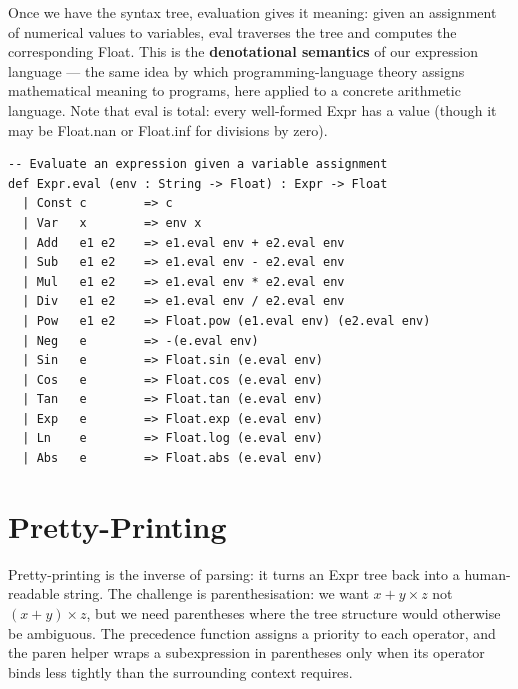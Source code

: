 \documentclass[12pt, openany]{book}
\theoremstyle{plain}
\theoremstyle{definition}
\theoremstyle{remark}
\newcommand{\li}[1]{{\ttfamily\small\color{tealaccent}#1}}
\begin{document}
Once we have the syntax tree, evaluation gives it meaning: given an assignment of numerical values to variables, \li{eval} traverses the tree and computes the corresponding \li{Float}.  This is the \textbf{denotational semantics} of our expression language --- the same idea by which programming-language theory assigns mathematical meaning to programs, here applied to a concrete arithmetic language.  Note that \li{eval} is total: every well-formed \li{Expr} has a value (though it may be \li{Float.nan} or \li{Float.inf} for divisions by zero).

\begin{leanbox}
\begin{lstlisting}
-- Evaluate an expression given a variable assignment
def Expr.eval (env : String -> Float) : Expr -> Float
  | Const c        => c
  | Var   x        => env x
  | Add   e1 e2    => e1.eval env + e2.eval env
  | Sub   e1 e2    => e1.eval env - e2.eval env
  | Mul   e1 e2    => e1.eval env * e2.eval env
  | Div   e1 e2    => e1.eval env / e2.eval env
  | Pow   e1 e2    => Float.pow (e1.eval env) (e2.eval env)
  | Neg   e        => -(e.eval env)
  | Sin   e        => Float.sin (e.eval env)
  | Cos   e        => Float.cos (e.eval env)
  | Tan   e        => Float.tan (e.eval env)
  | Exp   e        => Float.exp (e.eval env)
  | Ln    e        => Float.log (e.eval env)
  | Abs   e        => Float.abs (e.eval env)
\end{lstlisting}
\end{leanbox}
\color{black}

\section{Pretty-Printing}

Pretty-printing is the inverse of parsing: it turns an \li{Expr} tree back into a human-readable string.  The challenge is parenthesisation: we want $x + y \times z$ not $(x + y) \times z$, but we need parentheses where the tree structure would otherwise be ambiguous.  The precedence function assigns a priority to each operator, and the \li{paren} helper wraps a subexpression in parentheses only when its operator binds less tightly than the surrounding context requires.
\end{document}
